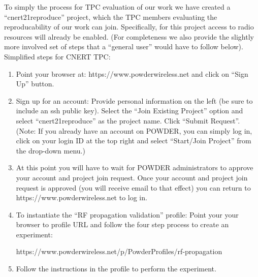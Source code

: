 \documentclass[10pt]{article}
\begin{document}
To simply the process for TPC evaluation of our work we have created
a ``cnert21reproduce'' project, which the TPC members evaluating the reproducability
of our work can join. Specifically, for this project access to radio resources
will already be enabled. (For completeness we also provide the slightly more involved
set of steps that a ``general user'' would have to follow below). 
Simplified steps for CNERT TPC:
\begin{enumerate}
\item Point your browser at: https://www.powderwireless.net and click on ``Sign Up'' button.
\item Sign up for an account: Provide personal information on the left (be sure to include
an ssh public key). Select the ``Join Existing Project'' option and select
``cnert21reproduce'' as the project name. Click ``Submit Request''. (Note: If you  already
have an account on POWDER, you can simply log in, click on your login ID at the
top right and select ``Start/Join Project'' from the drop-down menu.)
\item At this point you will have to wait for POWDER administrators to approve your account
and project join request. Once your account and project join request is approved (you will
receive email to that effect) you can return to
https://www.powderwireless.net to log in.
\item To instantiate the ``RF propagation validation'' profile: Point your your browser to
profile URL and follow the four step process to create an experiment: 
%

https://www.powderwireless.net/p/PowderProfiles/rf-propagation
\item Follow the instructions in the profile to perform the experiment.
\end{enumerate}
\end{document}
